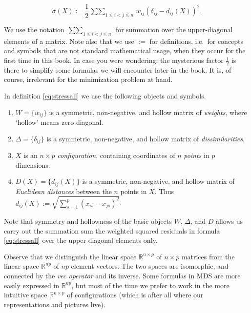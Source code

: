 \documentclass[
  12pt,
]{book}
\providecommand{\tightlist}{%
  \setlength{\itemsep}{0pt}\setlength{\parskip}{0pt}}
\theoremstyle{definition}
\theoremstyle{definition}
\theoremstyle{definition}
\theoremstyle{definition}
\theoremstyle{remark}
\begin{document}
\begin{equation}
\sigma(X):=\frac12\mathop{\sum\sum}_{1\leq i<j\leq n} w_{ij}(\delta_{ij}-d_{ij}(X))^2.
\label{eq:stressall}
\end{equation}

We use the notation \(\mathop{\sum\sum}_{1\leq i<j\leq n}\) for summation over the upper-diagonal elements of a matrix. Note also that we use \(:=\) for definitions, i.e.~for concepts and symbols that are not standard mathematical usage, when they occur for the first time in this book. In case you were wondering: the mysterious factor \(\frac12\) is there to simplify some formulas
we will encounter later in the book. It is, of course, irrelevant for the minimization
problem at hand.

In definition \eqref{eq:stressall} we use the following objects and symbols.

\begin{enumerate}
\def\labelenumi{\arabic{enumi}.}
\tightlist
\item
  \(W=\{w_{ij}\}\) is a symmetric, non-negative, and hollow matrix of
  \emph{weights}, where `hollow' means zero diagonal.
\item
  \(\Delta=\{\delta_{ij}\}\) is a symmetric, non-negative, and hollow
  matrix of \emph{dissimilarities}.
\item
  \(X\) is an \(n\times p\) \emph{configuration}, containing coordinates of \(n\)
  \emph{points} in \(p\) dimensions.
\item
  \(D(X)=\{d_{ij}(X)\}\) is a symmetric, non-negative, and hollow matrix
  of \emph{Euclidean distances} between the \(n\) points in \(X\). Thus
  \(d_{ij}(X):=\sqrt{\sum_{s=1}^p(x_{is}-x_{js})^2}\).
\end{enumerate}

Note that symmetry and hollowness of the basic objects \(W\), \(\Delta\), and
\(D\) allows us carry out the summation sum the weighted squared residuals in formula \eqref{eq:stressall} over the upper diagonal elements only.

Observe that we distinguish the linear space \(\mathbb{R}^{n\times p}\) of \(n\times p\) matrices from the linear space \(\mathbb{R}^{np}\) of \(np\) element vectors. The two spaces are isomorphic, and connected by the \emph{vec operator} and its inverse. Some formulas in MDS are more easily expressed in \(\mathbb{R}^{np}\), but most of the time we prefer to work in the more intuitive space \(\mathbb{R}^{n\times p}\) of configurations (which is after all where our representations
and pictures live).
\end{document}
